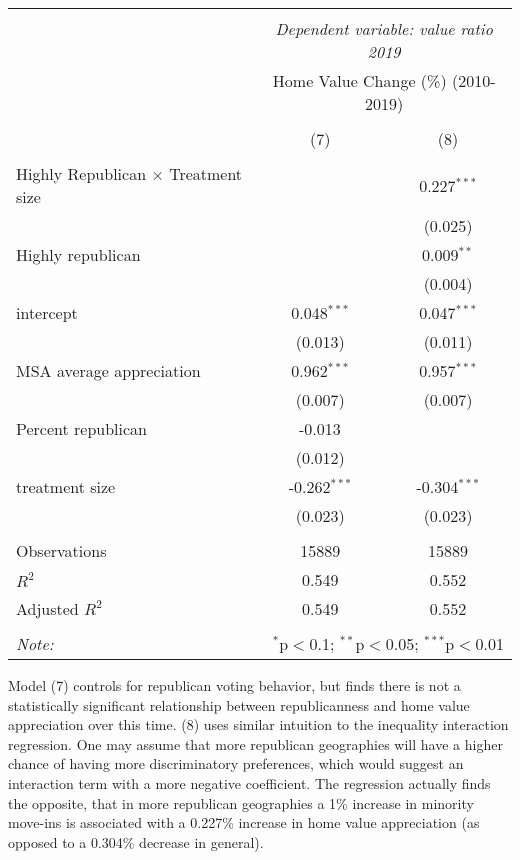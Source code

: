 \documentclass[11pt]{article}
\begin{document}
\begin{table}[!htbp] \centering
    \begin{tabular}{@{\extracolsep{5pt}}lcc}
    \\[-1.8ex]\hline
    \hline \\[-1.8ex]
    & \multicolumn{2}{c}{\textit{Dependent variable: value ratio 2019}} \
    \cr \cline{2-3}
    \\[-1.8ex] & \multicolumn{2}{c}{Home Value Change (\%) (2010-2019)}  \\
    \\[-1.8ex] & (7) & (8) \\
    \hline \\[-1.8ex]
    Highly Republican $\times$ Treatment size & & 0.227$^{***}$ \\
   & & (0.025) \\
    Highly republican & & 0.009$^{**}$ \\
   & & (0.004) \\
    intercept & 0.048$^{***}$ & 0.047$^{***}$ \\
   & (0.013) & (0.011) \\
   MSA average appreciation & 0.962$^{***}$ & 0.957$^{***}$ \\
   & (0.007) & (0.007) \\
    Percent republican & -0.013$^{}$ & \\
   & (0.012) & \\
    treatment size & -0.262$^{***}$ & -0.304$^{***}$ \\
   & (0.023) & (0.023) \\
   \hline \\[-1.8ex]
    Observations & 15889 & 15889 \\
    $R^2$ & 0.549 & 0.552 \\
    Adjusted $R^2$ & 0.549 & 0.552 \\
    \\[-1.8ex]
    \hline\hline 
    \textit{Note:} & \multicolumn{2}{r}{$^{*}$p$<$0.1; $^{**}$p$<$0.05; $^{***}$p$<$0.01} \\
    \end{tabular}
\end{table}


Model (7) controls for republican voting behavior, but finds there is not a
statistically significant relationship between republicanness and home
 value appreciation over this time. (8) uses similar intuition to the
  inequality interaction regression. One may assume that more republican
  geographies will have a higher chance of having more discriminatory
  preferences, which would suggest an interaction term with a more
  negative coefficient. The regression actually finds the opposite, that
  in more republican geographies a 1\% increase in minority move-ins is
  associated with a 0.227\% increase in home value appreciation (as
  opposed to a 0.304\% decrease in general).
\end{document}
